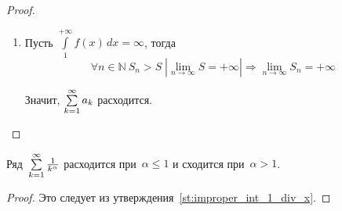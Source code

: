 \begin{proof}
\begin{enumerate}
\begin{minipage}[t]{68mm}
\begin{flushright}
	\end{flushright}
	\end{minipage}
	
	\item Пусть $\int\limits_1^{+\infty} f(x)\,dx = \infty$, тогда
	\begin{equation*}
	\forall n \in \mathbb N \ S_n > S \;
	\left| \lim\limits_{n \to \infty} S = +\infty \right| \Rightarrow
	\lim\limits_{n \to \infty} S_n = +\infty
	\end{equation*}
	
	Значит, $\series a_k$ расходится.
\end{enumerate}
\end{proof}

\begin{consequent}
\label{conseq:series_1_div_k}
Ряд~$\series \frac1{k^\alpha}$ расходится при~$\alpha \leqslant 1$ и сходится при~$\alpha > 1$.
\end{consequent}
\begin{proof}
Это следует из утверждения~\ref{st:improper_int_1_div_x}.
\end{proof}